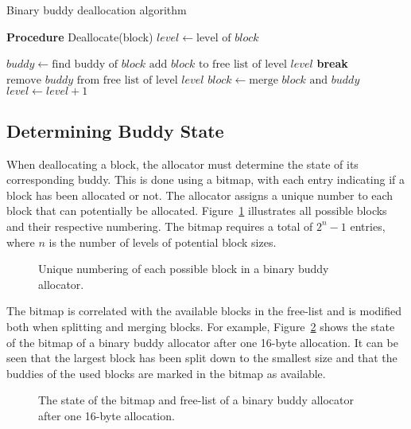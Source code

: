 \begin{algorithm}[h]
    \caption{Binary buddy deallocation algorithm}
    \label{alg:bbuddy_dealloc}
    \begin{algorithmic}[1]
        \Statex \textbf{Procedure} Deallocate(block)
        \State $level \gets \text{level of } block$

        \State $buddy \gets \text{find buddy of } block$
        \State $\text{add } block \text{ to free list of level } level$
        \State \textbf{break}
        \Else
        \State $\text{remove } buddy \text{ from free list of level } level$
        \State $block \gets \text{merge } block \text{ and } buddy$
        \State $level \gets level + 1$
        \EndIf
        \EndWhile
    \end{algorithmic}
\end{algorithm}

\FloatBarrier
\subsection{Determining Buddy State}
When deallocating a block, the allocator must determine the state of its corresponding buddy. This is done using a bitmap, with each entry indicating if a block has been allocated or not. The allocator assigns a unique number to each block that can potentially be allocated. Figure~\ref{fig:buddyorder} illustrates all possible blocks and their respective numbering. The bitmap requires a total of $2^n - 1$ entries, where $n$ is the number of levels of potential block sizes.

\begin{figure}[h]
    \centering
    
    \caption{Unique numbering of each possible block in a binary buddy allocator.}
    \label{fig:buddyorder}
\end{figure}
The bitmap is correlated with the available blocks in the free-list and is modified both when splitting and merging blocks. For example, Figure~\ref{fig:buddybmapallocated} shows the state of the bitmap of a binary buddy allocator after one 16-byte allocation. It can be seen that the largest block has been split down to the smallest size and that the buddies of the used blocks are marked in the bitmap as available.

\begin{figure}[H]
    \centering
    
    \caption{The state of the bitmap and free-list of a binary buddy allocator after one 16-byte allocation.}
    \label{fig:buddybmapallocated}
\end{figure}

